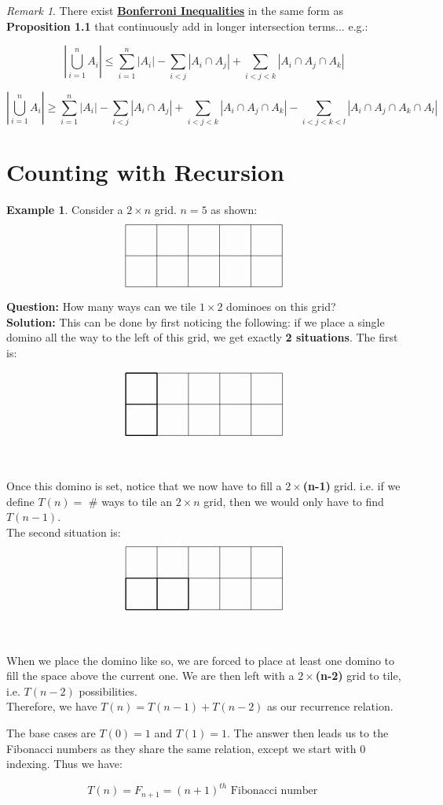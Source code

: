 \documentclass[psamsfonts, 12pt]{amsart}
\theoremstyle{definition}
\newtheorem{exmp}[thm]{Example}
\theoremstyle{remark}
\newtheorem*{rem*}{Remark}
\begin{document}
\begin{rem*}

There exist \textbf{\underline{Bonferroni Inequalities}} in the same form as \textbf{Proposition 1.1} that continuously add in longer intersection terms... e.g.:

\[
|\bigcup_{i=1}^nA_i| \leq \sum_{i=1}^n|A_i| - \sum_{i<j}|A_i \cap A_j | + \sum_{i<j<k}|A_i\cap A_j\cap A_k|
\]

\[
|\bigcup_{i=1}^nA_i| \geq \sum_{i=1}^n|A_i| - \sum_{i<j}|A_i \cap A_j | + \sum_{i<j<k}|A_i\cap A_j\cap A_k| - \sum_{i<j<k<l}|A_i\cap A_j\cap A_k\cap A_l|
\]
\end{rem*}

\section{Counting with Recursion}

\begin{exmp}
Consider a $2 \times n$ grid. $n = 5$ as shown:
\[\begin{tikzcd}
\draw[step=1.0,black,thin] grid (5,2);
\end{tikzcd}\]

\textbf{Question:} How many ways can we tile $1\times 2$ dominoes on this grid?
\ \\

\textbf{Solution:} This can be done by first noticing the following: if we place a single domino all the way to the left of this grid, we get exactly \textbf{2 situations}. The first is:

\[\begin{tikzcd}
\draw[step=1.0,black,thick, xshift=0.5cm,yshift=1cm] grid (1,2);
\draw[step=1.0,black,thin, xshift=0.5cm,yshift=1cm] grid (5,2);
\end{tikzcd}\]

Once this domino is set, notice that we now have to fill a $2\times$\textbf{(n-1)} grid. i.e. if we define $T(n) = $ \# ways to tile an $2\times n$ grid, then we would only have to find $T(n-1)$.
\\

The second situation is:
\[\begin{tikzcd}
\draw[step=1.0,black,thick, xshift=0.5cm,yshift=1cm] grid (2,1);
\draw[step=1.0,black,thin, xshift=0.5cm,yshift=1cm] grid (5,2);
\end{tikzcd}\]

When we place the domino like so, we are forced to place at least one domino to fill the space above the current one. We are then left with a $2\times $\textbf{(n-2)} grid to tile, i.e. $T(n-2)$ possibilities.
\\

Therefore, we have $T(n) = T(n-1) + T(n-2)$ as our recurrence relation.

The base cases are $T(0) = 1$ and $T(1) = 1$. The answer then leads us to the Fibonacci numbers as they share the same relation, except we start with 0 indexing. Thus we have:

\[
T(n) = F_{n+1} = (n+1)^{th} \text{ Fibonacci number }
\]

\end{exmp}
\end{document}
